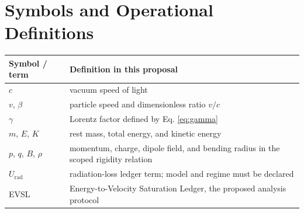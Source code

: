 \documentclass[conference]{../../../../Conference-LaTeX-template_10-17-19/IEEEtran}
\begin{document}
\section{Symbols and Operational Definitions}
\begin{tabularx}{0.96\columnwidth}{lY}
\toprule
Symbol / term & Definition in this proposal \\
\midrule
$c$ & vacuum speed of light \\
$v$, $\beta$ & particle speed and dimensionless ratio $v/c$ \\
$\gamma$ & Lorentz factor defined by Eq. \eqref{eq:gamma} \\
$m$, $E$, $K$ & rest mass, total energy, and kinetic energy \\
$p$, $q$, $B$, $\rho$ & momentum, charge, dipole field, and bending radius in the scoped rigidity relation \\
$U_{\mathrm{rad}}$ & radiation-loss ledger term; model and regime must be declared \\
EVSL & Energy-to-Velocity Saturation Ledger, the proposed analysis protocol \\
\bottomrule
\end{tabularx}
\end{document}
